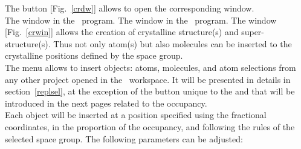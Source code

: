 The  button [Fig.~\ref{crdw}] allows to open the corresponding window. \\
\newpage
{}
{The  window in the \atomes\ program.}
{The  window in the \atomes\ program.}
\noindent The  window [Fig.~\ref{crwin}] allows the creation of crystalline structure(s) and super-structure(s). 
Thus not only atom(s) but also molecules can be inserted to the crystalline positions defined by the space group. \\
The  menu allows to insert objects: 
atoms, molecules, and atom selections from any other project opened in the \atomes\ workspace. 
It will be presented in details in section~\ref{replsel}, at the exception of the  button unique to the  and that will be introduced in the next pages related to the occupancy. \\
Each object will be inserted at a position specified using the fractional coordinates, in the proportion of the occupancy, and following the rules of the selected space group. 
\clearpage
The following parameters can be adjusted: 
